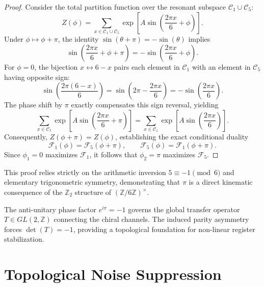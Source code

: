 \documentclass[aps,pra,twocolumn,10pt,superscriptaddress]{revtex4-2}
\newcommand{\Zmod}{\mathbb{Z}/6\mathbb{Z}}
\begin{document}
\begin{proof}
Consider the total partition function over the resonant subspace $\mathcal{C}_1 \cup \mathcal{C}_5$:
\begin{equation}
Z(\phi) = \sum_{x \in \mathcal{C}_1 \cup \mathcal{C}_5} \exp\left[A \sin\left(\frac{2\pi x}{6} + \phi\right)\right].
\label{eq:Z}
\end{equation}
Under $\phi \mapsto \phi + \pi$, the identity $\sin(\theta + \pi) = -\sin(\theta)$ implies
\begin{equation}
\sin\left(\frac{2\pi x}{6} + \phi + \pi\right) = -\sin\left(\frac{2\pi x}{6} + \phi\right).
\label{eq:sin_shift}
\end{equation}
For $\phi = 0$, the bijection $x \leftrightarrow 6-x$ pairs each element in $\mathcal{C}_1$ with an element in $\mathcal{C}_5$ having opposite sign:
\[
\sin\left(\frac{2\pi(6-x)}{6}\right) = \sin\left(2\pi - \frac{2\pi x}{6}\right) = -\sin\left(\frac{2\pi x}{6}\right).
\]
The phase shift by $\pi$ exactly compensates this sign reversal, yielding
\begin{equation}
\sum_{x \in \mathcal{C}_5} \exp\left[A \sin\left(\frac{2\pi x}{6} + \pi\right)\right] = \sum_{x \in \mathcal{C}_1} \exp\left[A \sin\left(\frac{2\pi x}{6}\right)\right].
\end{equation}
Consequently, $Z(\phi + \pi) = Z(\phi)$, establishing the exact conditional duality
\begin{equation}
\mathcal{F}_1(\phi) = \mathcal{F}_5(\phi + \pi), \qquad \mathcal{F}_5(\phi) = \mathcal{F}_1(\phi + \pi).
\label{eq:duality}
\end{equation}
Since $\phi_1 = 0$ maximizes $\mathcal{F}_1$, it follows that $\phi_2 = \pi$ maximizes $\mathcal{F}_5$.
\end{proof}

This proof relies strictly on the arithmetic inversion $5 \equiv -1 \pmod 6$ and elementary trigonometric symmetry, demonstrating that $\pi$ is a direct kinematic consequence of the $\mathbb{Z}_2$ structure of $(\Zmod)^\times$.

The anti-unitary phase factor $e^{i\pi} = -1$ governs the global transfer operator $T \in GL(2, \mathbb{Z})$ connecting the chiral channels. The induced parity asymmetry forces $\det(T) = -1$, providing a topological foundation for non-linear register stabilization.

\section{Topological Noise Suppression}
\label{sec:shielding}
\end{document}
